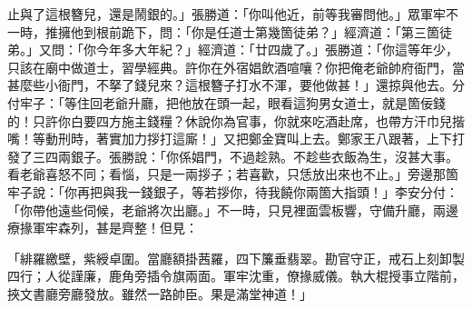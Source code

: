 止與了這根簪兒，還是鬧銀的。」張勝道：「你叫他近，前等我審問他。」眾軍牢不一時，推擁他到根前跪下，問：「你是任道士第幾箇徒弟？」經濟道：「第三箇徒弟。」又問：「你今年多大年紀？」經濟道：「廿四歲了。」張勝道：「你這等年少，只該在廟中做道士，習學經典。許你在外宿娼飲酒喧嚷？你把俺老爺帥府衙門，當甚麼些小衙門，不拏了錢兒來？這根簪子打水不渾，要他做甚！」還掠與他去。分付牢子：「等住回老爺升廳，把他放在頭一起，眼看這狗男女道士，就是箇佞錢的！只許你白要四方施主錢糧？休說你為官事，你就來吃酒赴席，也帶方汗巾兒揩嘴！等動刑時，著實加力拶打這廝！」又把鄭金寶叫上去。鄭家王八跟著，上下打發了三四兩銀子。張勝說：「你係娼門，不過趁熟。不趁些衣飯為生，沒甚大事。看老爺喜怒不同；看惱，只是一兩拶子；若喜歡，只恁放出來也不止。」旁邊那箇牢子說：「你再把與我一錢銀子，等若拶你，待我饒你兩箇大指頭！」李安分付：「你帶他遠些伺候，老爺將次出廳。」不一時，只見裡面雲板響，守備升廳，兩邊療掾軍牢森列，甚是齊整！但見：

「緋羅繳壁，紫綬卓圍。當廳額掛茜羅，四下簾垂翡翠。勘官守正，戒石上刻卸製四行；人從謹廉，鹿角旁插令旗兩面。軍牢沈重，僚掾威儀。執大棍授事立階前，挾文書廳旁廳發放。雖然一路帥臣。果是滿堂神道！」


